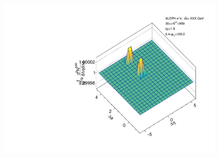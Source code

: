 \begin{figure}[htbp]
\begin{minipage}[b]{0.32\linewidth}
  \end{minipage}
  \begin{minipage}[b]{0.32\linewidth}
    \centering
    \includegraphics[width=\linewidth]{images/TwoParticleCorrelation/LEP2_THRUST/LEP2_THRUST_r_ratio_30_999.pdf}
    \label{fig:LEP2 Thrust Axis, Ratio Plot, Multiplicity 30-999, Ratio}
  \end{minipage}
\end{figure}